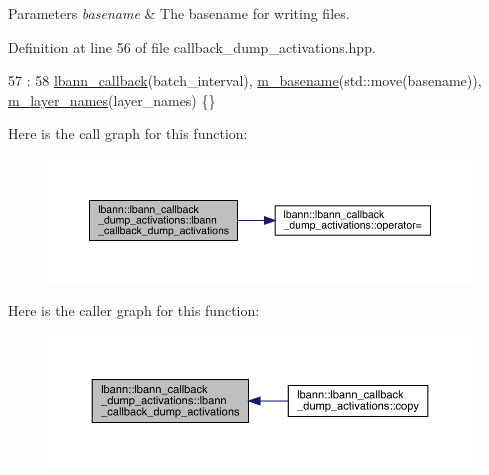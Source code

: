 \begin{DoxyParams}{Parameters}
{\em basename} & The basename for writing files. \\
\hline
\end{DoxyParams}


Definition at line 56 of file callback\+\_\+dump\+\_\+activations.\+hpp.


\begin{DoxyCode}
57                                                              :
58     \hyperlink{classlbann_1_1lbann__callback_a679057298a41ddd47f08c157f756c584}{lbann\_callback}(batch\_interval), \hyperlink{classlbann_1_1lbann__callback__dump__activations_a5775d9317de386e07cbd137122db6ee6}{m\_basename}(std::move(basename)), 
      \hyperlink{classlbann_1_1lbann__callback__dump__activations_aac56e32b6bef7923046c408f3a2dc857}{m\_layer\_names}(layer\_names) \{\}
\end{DoxyCode}
Here is the call graph for this function\+:\nopagebreak
\begin{figure}[H]
\begin{center}
\leavevmode
\includegraphics[width=350pt]{classlbann_1_1lbann__callback__dump__activations_a96d1412d4b29cab747bb0c1cfccd8a87_cgraph}
\end{center}
\end{figure}
Here is the caller graph for this function\+:\nopagebreak
\begin{figure}[H]
\begin{center}
\leavevmode
\includegraphics[width=350pt]{classlbann_1_1lbann__callback__dump__activations_a96d1412d4b29cab747bb0c1cfccd8a87_icgraph}
\end{center}
\end{figure}
\mbox{\label{classlbann_1_1lbann__callback__dump__activations_ad0a0a3ceb5c70c59fb334bd583ed7821}} 

